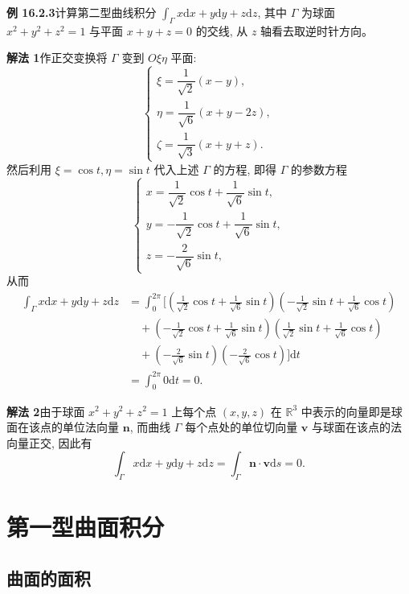 \documentclass[UTF8,12pt,a4paper,fontset=fandol]{ctexart}
\begin{document}
\noindent\textbf{例 16.2.3}\quad 计算第二型曲线积分 $\int_\Gamma x\mathrm dx+y\mathrm dy+z\mathrm dz$, 其中 $\Gamma$ 为球面 $x^2+y^2+z^2=1$ 与平面 $x+y+z=0$ 的交线, 从 $z$ 轴看去取逆时针方向。

\noindent\textbf{解法 1}\quad 作正交变换将 $\Gamma$ 变到 $O\xi\eta$ 平面:
\[
  \begin{cases}
    \xi=\dfrac1{\sqrt2}(x-y),\\
    \eta=\dfrac1{\sqrt6}(x+y-2z),\\
    \zeta=\dfrac1{\sqrt3}(x+y+z).
  \end{cases}
\]
然后利用 $\xi=\cos t,\eta=\sin t$ 代入上述 $\Gamma$ 的方程, 即得 $\Gamma$ 的参数方程
\[
  \begin{cases}
    x=\dfrac1{\sqrt2}\cos t+\dfrac1{\sqrt6}\sin t,\\
    y=-\dfrac1{\sqrt2}\cos t+\dfrac1{\sqrt6}\sin t,\\
    z=-\dfrac2{\sqrt6}\sin t,
  \end{cases}
\]
从而
\[
\begin{aligned}
  \int_\Gamma x\mathrm dx+y\mathrm dy+z\mathrm dz
  &=\int_0^{2\pi}\bigg[
    \left(\frac1{\sqrt2}\cos t+\frac1{\sqrt6}\sin t\right)
    \left(-\frac1{\sqrt2}\sin t+\frac1{\sqrt6}\cos t\right)\\
  &\quad+
    \left(-\frac1{\sqrt2}\cos t+\frac1{\sqrt6}\sin t\right)
    \left(\frac1{\sqrt2}\sin t+\frac1{\sqrt6}\cos t\right)\\
  &\quad+
    \left(-\frac2{\sqrt6}\sin t\right)
    \left(-\frac2{\sqrt6}\cos t\right)
  \bigg]\mathrm dt\\
  &=\int_0^{2\pi}0\mathrm dt=0.
\end{aligned}
\]

\noindent\textbf{解法 2}\quad 由于球面 $x^2+y^2+z^2=1$ 上每个点 $(x,y,z)$ 在 $\mathbb R^3$ 中表示的向量即是球面在该点的单位法向量 $\boldsymbol n$, 而曲线 $\Gamma$ 每个点处的单位切向量 $\boldsymbol v$ 与球面在该点的法向量正交, 因此有
\[
  \int_\Gamma x\mathrm dx+y\mathrm dy+z\mathrm dz
  =\int_\Gamma \boldsymbol n\cdot\boldsymbol v\mathrm ds=0.
\]

\section{第一型曲面积分}

\subsection{曲面的面积}
\end{document}
